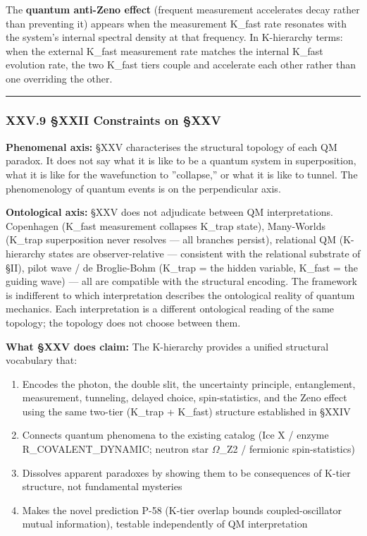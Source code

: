 \documentclass[12pt,a4paper]{article}
\begin{document}
The \textbf{quantum anti-Zeno effect} (frequent measurement accelerates decay rather than preventing it) appears when the measurement K\_fast rate resonates with the system's internal spectral density at that frequency. In K-hierarchy terms: when the external K\_fast measurement rate matches the internal K\_fast evolution rate, the two K\_fast tiers couple and accelerate each other rather than one overriding the other.

\begin{center}
\rule{0.5\textwidth}{0.4pt}
\end{center}

\subsubsection{XXV.9 §XXII Constraints on §XXV}

\textbf{Phenomenal axis:} §XXV characterises the structural topology of each QM paradox. It does not say what it is like to be a quantum system in superposition, what it is like for the wavefunction to ''collapse,'' or what it is like to tunnel. The phenomenology of quantum events is on the perpendicular axis.

\textbf{Ontological axis:} §XXV does not adjudicate between QM interpretations. Copenhagen (K\_fast measurement collapses K\_trap state), Many-Worlds (K\_trap superposition never resolves --- all branches persist), relational QM (K-hierarchy states are observer-relative --- consistent with the relational substrate of §II), pilot wave / de Broglie-Bohm (K\_trap = the hidden variable, K\_fast = the guiding wave) --- all are compatible with the structural encoding. The framework is indifferent to which interpretation describes the ontological reality of quantum mechanics. Each interpretation is a different ontological reading of the same topology; the topology does not choose between them.

\textbf{What §XXV does claim:} The K-hierarchy provides a unified structural vocabulary that:

\begin{enumerate}
    \item Encodes the photon, the double slit, the uncertainty principle, entanglement, measurement, tunneling, delayed choice, spin-statistics, and the Zeno effect using the same two-tier (K\_trap + K\_fast) structure established in §XXIV
    \item Connects quantum phenomena to the existing catalog (Ice X / enzyme R\_COVALENT\_DYNAMIC; neutron star $\Omega$\_Z2 / fermionic spin-statistics)
    \item Dissolves apparent paradoxes by showing them to be consequences of K-tier structure, not fundamental mysteries
    \item Makes the novel prediction P-58 (K-tier overlap bounds coupled-oscillator mutual information), testable independently of QM interpretation
\end{enumerate}
\end{document}
